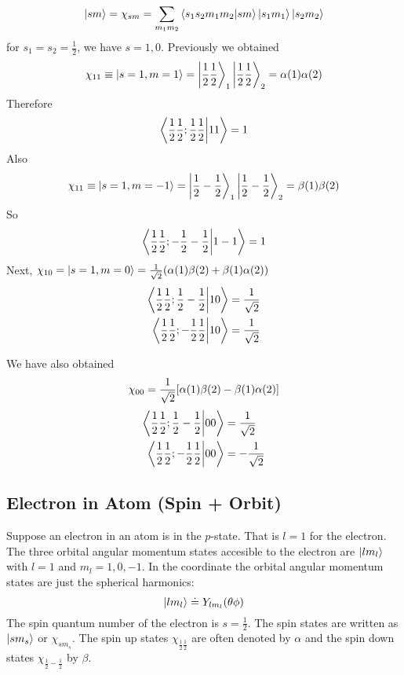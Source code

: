 \begin{equation}
\ket{s m} = \chi_{s m} = \sum_{m_1 m_2} \braket{s_1 s_2 m_1 m_2}{s m} \ket{s_1 m_1} \ket{s_2 m_2}
\end{equation}
for $s_1 = s_2 = \frac{1}{2}$, we have $s=1,0$. Previously we obtained
\begin{equation}
\chi_{11} \equiv \ket{s=1,m=1} = \ket{\frac{1}{2}\frac{1}{2}}_1 \ket{\frac{1}{2}\frac{1}{2}}_2 = \alpha(1)\alpha(2)
\end{equation}
Therefore
\begin{equation}
\braket{\frac{1}{2}\frac{1}{2};\frac{1}{2}\frac{1}{2}}{1 1} = 1
\end{equation}
Also 
\begin{equation}
\chi_{11} \equiv \ket{s=1,m=-1} = \ket{\frac{1}{2}-\frac{1}{2}}_1 \ket{\frac{1}{2}-\frac{1}{2}}_2 = \beta(1)\beta(2)
\end{equation}
So
\begin{equation}
\braket{\frac{1}{2}\frac{1}{2};-\frac{1}{2}-\frac{1}{2}}{1 -1} = 1
\end{equation}
Next, $\chi_{1 0} = \ket{s=1, m=0} = \frac{1}{\sqrt{2}} \qty(\alpha(1)\beta(2) + \beta(1)\alpha(2))$
\begin{align*}
\braket{\frac{1}{2}\frac{1}{2};\frac{1}{2}-\frac{1}{2}}{1 0} &= \frac{1}{\sqrt{2}} \\
\braket{\frac{1}{2}\frac{1}{2};-\frac{1}{2}\frac{1}{2}}{1 0} &= \frac{1}{\sqrt{2}} 
\end{align*}

We have also obtained
\begin{equation}
\chi_{0 0} = \frac{1}{\sqrt{2}} \qty[\alpha(1)\beta(2) - \beta(1)\alpha(2)]
\end{equation}
\begin{align*}
\braket{\frac{1}{2}\frac{1}{2};\frac{1}{2}-\frac{1}{2}}{0 0} &= \frac{1}{\sqrt{2}} \\
\braket{\frac{1}{2}\frac{1}{2};-\frac{1}{2}\frac{1}{2}}{0 0} &= -\frac{1}{\sqrt{2}} 
\end{align*}






\subsection{Electron in Atom (Spin + Orbit)}
Suppose an electron in an atom is in the $p$-state. That is $l=1$ for the electron. The three orbital angular momentum states accesible to the electron are $\ket{l m_l}$ with $l=1$ and $m_l = 1,0,-1$. In the coordinate the orbital angular momentum states are just the spherical harmonics:
\begin{equation}
\ket{l m_l} \doteq Y_{l m_l}\qty(\theta\phi)
\end{equation}
The spin quantum number of the electron is $s=\frac{1}{2}$. The spin states are written as $\ket{s m_s}$ or $\chi_{s m_s}$. The spin up states $\chi_{\frac{1}{2}\frac{1}{2}}$ are often denoted by $\alpha$ and the spin down states  $\chi_{\frac{1}{2}-\frac{1}{2}}$ by $\beta$.

